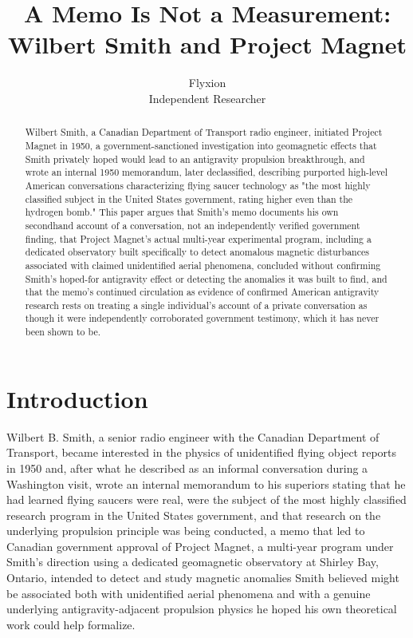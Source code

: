 \documentclass[11pt]{article}
\title{A Memo Is Not a Measurement: Wilbert Smith and Project Magnet}
\author{Flyxion \\ \small Independent Researcher}
\date{}
\begin{document}
\maketitle

\begin{abstract}
Wilbert Smith, a Canadian Department of Transport radio engineer, initiated Project Magnet in 1950, a government-sanctioned investigation into geomagnetic effects that Smith privately hoped would lead to an antigravity propulsion breakthrough, and wrote an internal 1950 memorandum, later declassified, describing purported high-level American conversations characterizing flying saucer technology as "the most highly classified subject in the United States government, rating higher even than the hydrogen bomb." This paper argues that Smith's memo documents his own secondhand account of a conversation, not an independently verified government finding, that Project Magnet's actual multi-year experimental program, including a dedicated observatory built specifically to detect anomalous magnetic disturbances associated with claimed unidentified aerial phenomena, concluded without confirming Smith's hoped-for antigravity effect or detecting the anomalies it was built to find, and that the memo's continued circulation as evidence of confirmed American antigravity research rests on treating a single individual's account of a private conversation as though it were independently corroborated government testimony, which it has never been shown to be.
\end{abstract}

\section{Introduction}

Wilbert B. Smith, a senior radio engineer with the Canadian Department of Transport, became interested in the physics of unidentified flying object reports in 1950 and, after what he described as an informal conversation during a Washington visit, wrote an internal memorandum to his superiors stating that he had learned flying saucers were real, were the subject of the most highly classified research program in the United States government, and that research on the underlying propulsion principle was being conducted, a memo that led to Canadian government approval of Project Magnet, a multi-year program under Smith's direction using a dedicated geomagnetic observatory at Shirley Bay, Ontario, intended to detect and study magnetic anomalies Smith believed might be associated both with unidentified aerial phenomena and with a genuine underlying antigravity-adjacent propulsion physics he hoped his own theoretical work could help formalize.
\end{document}

